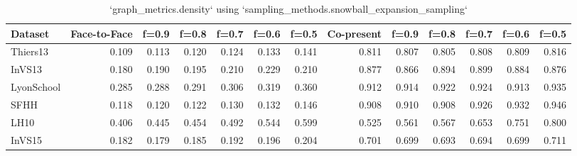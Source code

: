 \begin{table}[ht]
\begin{tabular}{lrrrrrrrrrrrr}
\hline
 Dataset    &   Face-to-Face &   f=0.9 &   f=0.8 &   f=0.7 &   f=0.6 &   f=0.5 &   Co-present &   f=0.9 &   f=0.8 &   f=0.7 &   f=0.6 &   f=0.5 \\
\hline
 Thiers13   &          0.109 &   0.113 &   0.120 &   0.124 &   0.133 &   0.141 &        0.811 &   0.807 &   0.805 &   0.808 &   0.809 &   0.816 \\
 InVS13     &          0.180 &   0.190 &   0.195 &   0.210 &   0.229 &   0.210 &        0.877 &   0.866 &   0.894 &   0.899 &   0.884 &   0.876 \\
 LyonSchool &          0.285 &   0.288 &   0.291 &   0.306 &   0.319 &   0.360 &        0.912 &   0.914 &   0.922 &   0.924 &   0.913 &   0.935 \\
 SFHH       &          0.118 &   0.120 &   0.122 &   0.130 &   0.132 &   0.146 &        0.908 &   0.910 &   0.908 &   0.926 &   0.932 &   0.946 \\
 LH10       &          0.406 &   0.445 &   0.454 &   0.492 &   0.544 &   0.599 &        0.525 &   0.561 &   0.567 &   0.653 &   0.751 &   0.800 \\
 InVS15     &          0.182 &   0.179 &   0.185 &   0.192 &   0.196 &   0.204 &        0.701 &   0.699 &   0.693 &   0.694 &   0.699 &   0.711 \\
\hline
\end{tabular}
\caption{`graph_metrics.density` using `sampling_methods.snowball_expansion_sampling`}
\end{table}